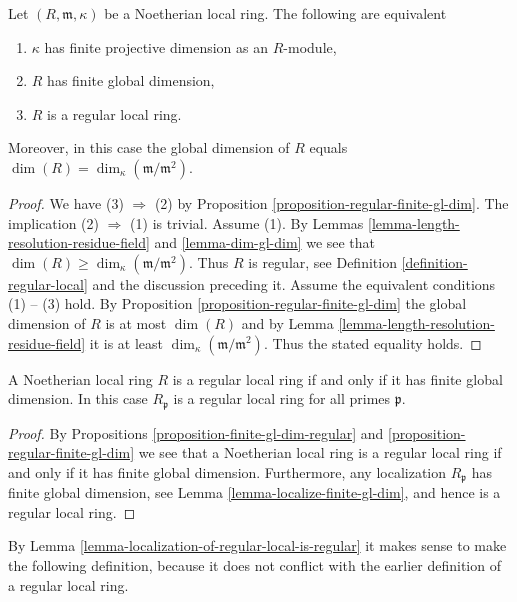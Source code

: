 \begin{proposition}
\label{proposition-finite-gl-dim-regular}
Let $(R, \mathfrak m, \kappa)$ be a Noetherian local ring.
The following are equivalent
\begin{enumerate}
\item $\kappa$ has finite projective dimension as an $R$-module,
\item $R$ has finite global dimension,
\item $R$ is a regular local ring.
\end{enumerate}
Moreover, in this case the global dimension of $R$ equals
$\dim(R) = \dim_\kappa(\mathfrak m/\mathfrak m^2)$.
\end{proposition}

\begin{proof}
We have (3) $\Rightarrow$ (2) by
Proposition \ref{proposition-regular-finite-gl-dim}.
The implication (2) $\Rightarrow$ (1) is trivial.
Assume (1). By Lemmas \ref{lemma-length-resolution-residue-field}
and \ref{lemma-dim-gl-dim} we see that
$\dim(R) \geq \dim_\kappa(\mathfrak m /\mathfrak m^2)$.
Thus $R$ is regular, see Definition
\ref{definition-regular-local} and the discussion preceding it.
Assume the equivalent conditions (1) -- (3) hold.
By Proposition \ref{proposition-regular-finite-gl-dim}
the global dimension of $R$ is at most $\dim(R)$ and by
Lemma \ref{lemma-length-resolution-residue-field}
it is at least $\dim_\kappa(\mathfrak m/\mathfrak m^2)$.
Thus the stated equality holds.
\end{proof}

\begin{lemma}
\label{lemma-localization-of-regular-local-is-regular}
A Noetherian local ring $R$ is a regular local ring if and only if
it has finite global dimension. In this case
$R_{\mathfrak p}$ is a regular local ring for all primes $\mathfrak p$.
\end{lemma}

\begin{proof}
By Propositions \ref{proposition-finite-gl-dim-regular} and
\ref{proposition-regular-finite-gl-dim}
we see that a Noetherian local ring is a regular local ring if and only if
it has finite global dimension. Furthermore, any localization
$R_{\mathfrak p}$ has finite global dimension,
see Lemma \ref{lemma-localize-finite-gl-dim},
and hence is a regular local ring.
\end{proof}

\noindent
By Lemma \ref{lemma-localization-of-regular-local-is-regular}
it makes sense to make the following definition,
because it does not conflict with the earlier
definition of a regular local ring.

